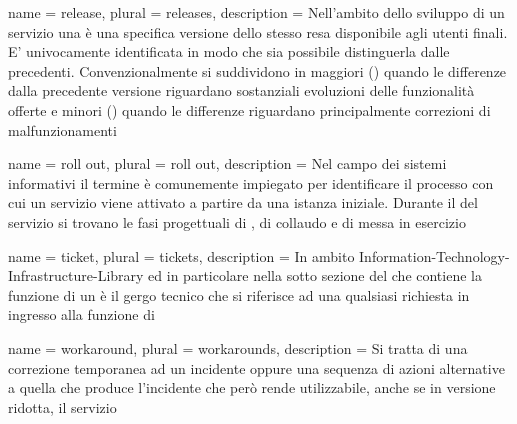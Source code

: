 {
	name		= {release},
	plural		= {releases},
	description = {Nell'ambito dello sviluppo di un servizio una  è una specifica versione dello stesso resa disponibile agli utenti finali. E' univocamente identificata in modo che sia possibile distinguerla dalle precedenti. Convenzionalmente si suddividono in  maggiori () quando le differenze dalla precedente versione riguardano sostanziali evoluzioni delle funzionalità offerte e  minori () quando le differenze riguardano principalmente correzioni di malfunzionamenti}
}

{
	name		= {roll out},
	plural		= {roll out},
	description = {Nel campo dei sistemi informativi il termine  è comunemente impiegato per identificare il processo con cui un servizio viene attivato a partire da una istanza iniziale. Durante il  del servizio si trovano le fasi progettuali di , di collaudo e di messa in esercizio}
}

{
	name		= {ticket},
	plural		= {tickets},
	description = {In ambito \ac{Information-Technology-Infrastructure-Library} ed in particolare nella sotto sezione del  che contiene la funzione di  un  è il gergo tecnico che si riferisce ad una qualsiasi richiesta in ingresso alla funzione di }
}

{
	name		= {workaround},
	plural		= {workarounds},
	description	= {Si tratta di una correzione temporanea ad un incidente oppure una sequenza di azioni alternative a quella che produce l'incidente che però rende utilizzabile, anche se in versione ridotta, il servizio}
}